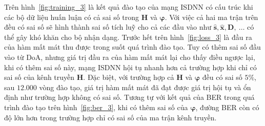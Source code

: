 Trên hình~\ref{fig:training_3} là kết quả đào tạo của mạng ISDNN có cấu trúc khi các bộ dữ liệu huấn luận có cả sai số trong $\mathbf{H}$ và ${\boldsymbol{\varphi}}$. Với việc cả hai ma trận trên đều có sai số sẽ hình thành sai số tích luỹ cho cả các đầu vào như $\hat{\mathbf{s}}, \hat{\mathbf{x}}, \mathbf{D},~\ldots$ có thể gây khó khăn cho bộ nhận dạng. Trước hết trên hình~\ref{fig:loss_3} là đầu ra của hàm mất mát thu được trong suốt quá trình đào tạo. Tuy có thêm sai số đầu vào từ DoA, nhưng giá trị đầu ra của hàm mất mát lại cho thấy điều ngược lại, khi có thêm sai số này, mạng ISDNN hội tụ nhanh hơn cả trường hợp khi chỉ có sai số của kênh truyền $\mathbf{H}$. Đặc biệt, với trường hợp cả $\mathbf{H}$ và ${\boldsymbol{\varphi}}$ đều có sai số $5\%$, sau $12.000$ vòng đào tạo, giá trị hàm mất mát đã đạt được giá trị hội tụ và ổn định như trường hợp không có sai số. Tương tự với kết quả của BER trong quá trình đào tạo trên hình~\ref{fig:ber_3}, khi có thêm sai số của $\boldsymbol{\varphi}$, đường BER còn có độ lớn hơn trong trường hợp chỉ có sai số của ma trận kênh truyền.
